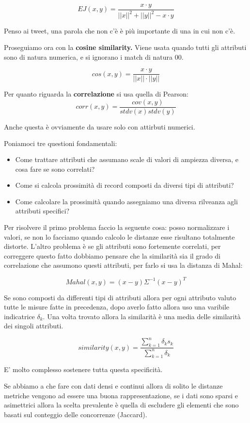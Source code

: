 \documentclass[12pt, a4paper,titlepage,openany]{article}
\begin{document}
 \[ EJ(x,y) = \frac{x \cdot y }{||x|| ^{2}+||y|| ^{2} -x \cdot y  } \]
 
 Penso ai tweet, una parola che non c'è è più importante di una in cui non c'è.
 
 Proseguiamo ora con la \textbf{cosine similarity.}
 Viene usata quando tutti gli attributi sono di natura numerica, e si ignorano i match di natura 00.
 
  \[ cos(x,y) = \frac{x \cdot y }{||x|| \cdot ||y||  } \]
  
  Per quanto riguarda la \textbf{correlazione} si usa quella di Pearson:
  \[ corr(x,y) = \frac{cov(x,y)}{stdv(x)stdv(y)}\]
  
 Anche questa è ovviamente da usare solo con attirbuti numerici.
 
 Poniamoci tre questioni fondamentali:
 \begin{itemize}
 	\item Come trattare attributi che assumano scale di valori di ampiezza diversa, e cosa fare se sono correlati?
 	\item Come si calcola prossimità di record composti da diversi tipi di attributi?
 	\item Come calcolare la prossimità quando assegniamo una diversa rilveanza agli attributi specifici?
 \end{itemize}
Per risolvere il primo problema faccio la seguente cosa: posso normalizzare i valori, se non lo facciamo quando calcolo le distanze esse risultano totalmente distorte. L'altro problema è se gli attributi sono fortemente correlati, per correggere questo fatto dobbiamo pensare che la similarità sia il grado di correlazione che assumono questi attributi, per farlo si usa la distanza di Mahal:

\[Mahal(x,y) = (x- y)\Sigma^{-1}(x- y)^{T}\]

Se sono composti da differenti tipi di attributi allora per ogni attributo valuto tutte le misure fatte in precedenza, dopo averlo fatto allora uso una varibile indicatrice $\delta_{k}$. Una volta trovato allora la similarità è una media delle similarità dei singoli attributi.

\[similarity(x,y) = \frac{\sum_{k = 1}^{n}\delta_{k} s_{k}}{\sum_{k = 1}^{n}\delta_{k}}\]

E' molto complesso sostenere tutta questa specificità.

Se abbiamo a che fare con dati densi e continui allora di solito le distanze metriche vengono ad essere una buona rappresentazione, se i dati sono sparsi e asimettrici allora la scelta prevalente è quella di escludere gli elementi che sono basati sul conteggio delle concorrenze (Jaccard).
\end{document}
